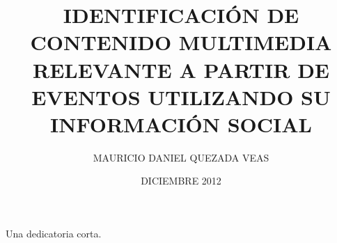 \documentclass[upright, contnum]{umemoria}
\author{MAURICIO DANIEL QUEZADA VEAS}
\title{IDENTIFICACI\'ON DE CONTENIDO MULTIMEDIA RELEVANTE A PARTIR DE EVENTOS UTILIZANDO SU INFORMACI\'ON SOCIAL}
\date{DICIEMBRE 2012}
\begin{document}
\frontmatter
\maketitle

\begin{abstract}
\lipsum[1-4]
\end{abstract}

\begin{dedicatoria}
Una dedicatoria corta.
\end{dedicatoria}

\begin{thanks}
\lipsum[1-2]
\end{thanks}

\cleardoublepage
\begin{spacing}{1.5}
\tableofcontents
\end{spacing}
\listoffigures

\mainmatter








\nocite{*}


\end{document}
